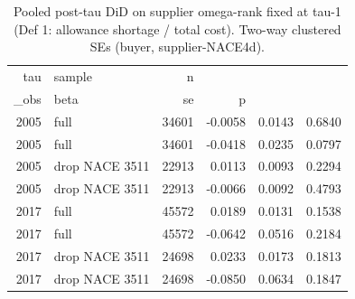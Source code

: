 \begin{table}[ht]
\centering
\caption{Pooled post-tau DiD on supplier omega-rank fixed at tau-1 (Def 1: allowance shortage / total cost). Two-way clustered SEs (buyer, supplier-NACE4d).} 
\begin{tabular}{rlrrrr}
  \toprule
tau & sample & n\\_obs & beta & se & p \\ 
  \midrule
 2005 & full & 34601 & -0.0058 & 0.0143 & 0.6840 \\ 
   2005 & full & 34601 & -0.0418 & 0.0235 & 0.0797 \\ 
   2005 & drop NACE 3511 & 22913 & 0.0113 & 0.0093 & 0.2294 \\ 
   2005 & drop NACE 3511 & 22913 & -0.0066 & 0.0092 & 0.4793 \\ 
   2017 & full & 45572 & 0.0189 & 0.0131 & 0.1538 \\ 
   2017 & full & 45572 & -0.0642 & 0.0516 & 0.2184 \\ 
   2017 & drop NACE 3511 & 24698 & 0.0233 & 0.0173 & 0.1813 \\ 
   2017 & drop NACE 3511 & 24698 & -0.0850 & 0.0634 & 0.1847 \\ 
   \bottomrule
\end{tabular}
\end{table}
